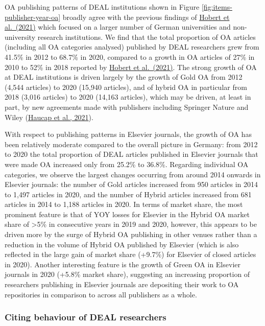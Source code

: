 \documentclass[
]{article}
\begin{document}
OA publishing patterns of DEAL institutions shown in Figure \ref{fig:items-publisher-year-oa} broadly agree with the previous findings of \href{https://doi.org/10.1007/s11192-021-04002-0}{Hobert et al.~(2021)} which focused on a larger number of German universities and non-university research institutions. We find that the total proportion of OA articles (including all OA categories analysed) published by DEAL researchers grew from 41.5\% in 2012 to 68.7\% in 2020, compared to a growth in OA articles of 27\% in 2010 to 52\% in 2018 reported by \href{https://doi.org/10.1007/s11192-021-04002-0}{Hobert et al.~(2021)}. The strong growth of OA at DEAL institutions is driven largely by the growth of Gold OA from 2012 (4,544 articles) to 2020 (15,940 articles), and of hybrid OA in particular from 2018 (3,016 articles) to 2020 (14,163 articles), which may be driven, at least in part, by new agreements made with publishers including Springer Nature and Wiley (\href{https://www.cesifo.org/en/publikationen/2021/working-paper/impact-german-deal-competition-academic-publishing-market}{Haucap et al., 2021}).

With respect to publishing patterns in Elsevier journals, the growth of OA has been relatively moderate compared to the overall picture in Germany: from 2012 to 2020 the total proportion of DEAL articles published in Elsevier journals that were made OA increased only from 25.2\% to 36.8\%. Regarding individual OA categories, we observe the largest changes occurring from around 2014 onwards in Elsevier journals: the number of Gold articles increased from 950 articles in 2014 to 1,497 articles in 2020, and the number of Hybrid articles increased from 681 articles in 2014 to 1,188 articles in 2020. In terms of market share, the most prominent feature is that of YOY losses for Elsevier in the Hybrid OA market share of \textgreater5\% in consecutive years in 2019 and 2020, however, this appears to be driven more by the surge of Hybrid OA publishing in other venues rather than a reduction in the volume of Hybrid OA published by Elsevier (which is also reflected in the large gain of market share (+9.7\%) for Elsevier of closed articles in 2020). Another interesting feature is the growth of Green OA in Elsevier journals in 2020 (+5.8\% market share), suggesting an increasing proportion of researchers publishing in Elsevier journals are depositing their work to OA repositories in comparison to across all publishers as a whole.

\hypertarget{citing-behaviour-of-deal-researchers}{%
\subsubsection{Citing behaviour of DEAL researchers}\label{citing-behaviour-of-deal-researchers}}
\end{document}

